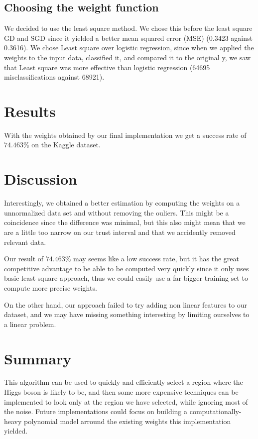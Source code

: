 \documentclass[10pt,conference,compsocconf]{IEEEtran}
\begin{document}
\subsection{Choosing the weight function} We decided to use the least square method. We chose this before the least square GD and SGD since it yielded a better mean squared error (MSE) (0.3423 against 0.3616). We chose Least square over logistic regression, since when we applied the weights to the input data, classified it, and compared it to the original y, we saw that Least square was more effective than logistic regression (64695 misclassifications against 68921).
\section{Results}
With the weights obtained by our final implementation we get a success rate of $74.463\%$ on the Kaggle dataset.

\section{Discussion}
Interestingly, we obtained a better estimation by computing the weights on a unnormalized data set and without removing the ouliers. This might be a coincidence since the difference was minimal, but this also might mean that we are a little too narrow on our trust interval and that we accidently removed relevant data.

Our result of $74.463\%$ may seems like a low success rate, but it has the great competitive advantage to be able to be computed very quickly since it only uses basic least square approach, thus we could easily use a far bigger training set to compute more precise weights.

On the other hand, our approach failed to try adding non linear features to our dataset, and we may have missing something interesting by limiting ourselves to a linear problem.

\section{Summary}
This algorithm can be used to quickly and efficiently select a region where the Higgs boson is likely to be, and then some more expensive techniques can be implemented to look only at the region we have selected, while ignoring most of the noise. Future implementations could focus on building a computationally-heavy polynomial model arround the existing weights this implementation yielded. 



\end{document}

